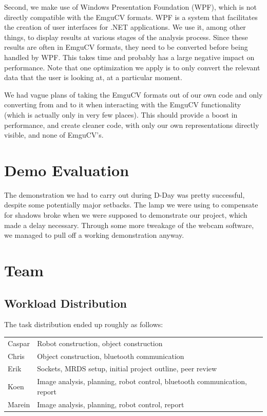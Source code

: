 \documentclass[10pt, abstracton, twocolumn]{scrartcl}
\begin{document}
\begin{appendices}
Second, we make use of Windows Presentation Foundation (WPF), which is not directly compatible with the EmguCV formats. WPF is a system that facilitates the creation of user interfaces for .NET applications. We use it, among other things, to display results at various stages of the analysis process. Since these results are often in EmguCV formats, they need to be converted before being handled by WPF. This takes time and probably has a large negative impact on performance. Note that one optimization we apply is to only convert the relevant data that the user is looking at, at a particular moment.

We had vague plans of taking the EmguCV formats out of our own code and only converting from and to it when interacting with the EmguCV functionality (which is actually only in very few places). This should provide a boost in performance, and create cleaner code, with only our own representations directly visible, and none of EmguCV's.

\section{Demo Evaluation}
The demonstration we had to carry out during D-Day was pretty successful, despite some potentially major setbacks. The lamp we were using to compensate for shadows broke when we were supposed to demonstrate our project, which made a delay necessary. Through some more tweakage of the webcam software, we managed to pull off a working demonstration anyway.

\section{Team}
\label{sec:team}

\subsection{Workload Distribution}

\begin{samepage}

The task distribution ended up roughly as follows:\\
\nolinebreak
\begin{tabularx}{3.2in}{ l | X }
Caspar & Robot construction, object construction \\ 
Chris & Object construction, bluetooth communication \\ 
Erik & Sockets, MRDS setup, initial project outline, peer review \\ 
Koen & Image analysis, planning, robot control, bluetooth communication, report \\ 
Marein & Image analysis, planning, robot control, report \\
\end{tabularx}\\


\end{samepage}
\end{appendices}
\end{document}
